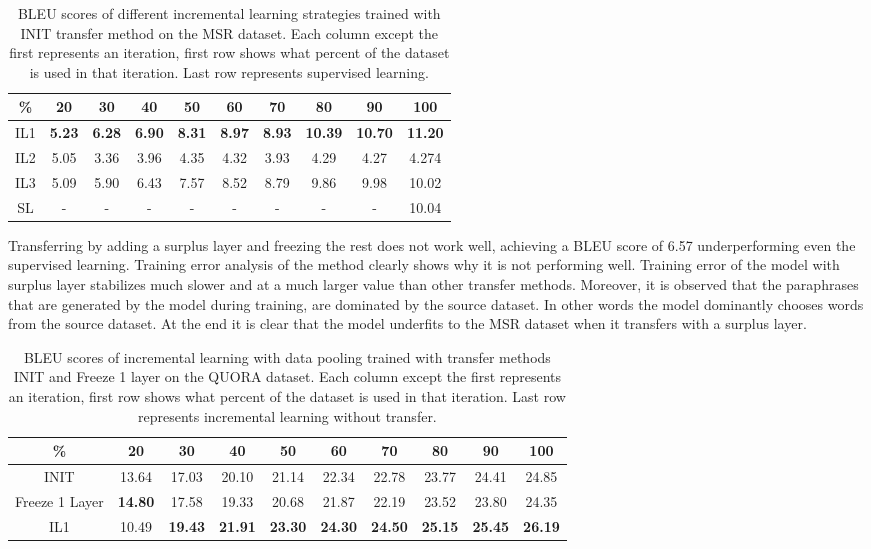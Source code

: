 \begin{table}[t]
\centering
\small
 \begin{tabular}{|c | c | c | c | c | c | c | c | c | c |} 
 \hline
 \% & 20 & 30 & 40 & 50 & 60 & 70 & 80 & 90 & 100 \\ [0.5ex] 
 \hline
  IL1 & \textbf{5.23} & \textbf{6.28} & \textbf{6.90} & \textbf{8.31} & \textbf{8.97} & \textbf{8.93} & \textbf{10.39} & \textbf{10.70} & \textbf{11.20}  \\ 
 \hline
  IL2 & 5.05 & 3.36 & 3.96 & 4.35 & 4.32 & 3.93 & 4.29 & 4.27 & 4.274 \\ 
 \hline
  IL3 & 5.09 & 5.90 & 6.43 & 7.57 & 8.52 & 8.79 & 9.86 & 9.98 & 10.02 \\ 
  \hline
  SL & - & - & - & - & - & - & - & - & 10.04 \\ 
 \hline
\end{tabular}
\caption{BLEU scores of different incremental learning strategies trained with INIT transfer method on the MSR dataset. Each column except the first represents an iteration, first row shows what percent of the dataset is used in that iteration. Last row represents supervised learning.}
\end{table}

Transferring by adding a surplus layer and freezing the rest does not work well, achieving a BLEU score of 6.57 underperforming even the supervised learning. Training error analysis of the method clearly shows why it is not performing well. Training error of the model with surplus layer stabilizes much slower and at a much larger value than other transfer methods. Moreover, it is observed that the paraphrases that are generated by the model during training, are dominated by the source dataset. In other words the model dominantly chooses words from the source dataset. At the end it is clear that the model underfits to the MSR dataset when it transfers with a surplus layer.

\begin{table}[b]
\centering
\footnotesize
 \begin{tabular}{|c | c | c | c | c | c | c | c | c | c |} 
 \hline
 \% & 20 & 30 & 40 & 50 & 60 & 70 & 80 & 90 & 100 \\ [0.5ex] 
 \hline
  INIT & 13.64 & 17.03 & 20.10 & 21.14 & 22.34 & 22.78 & 23.77 & 24.41 & 24.85  \\ 
 \hline
  Freeze 1 Layer &  \textbf{14.80} & 17.58 & 19.33 & 20.68 & 21.87 & 22.19 & 23.52 & 23.80 & 24.35 \\ 
  \hline
  IL1 & 10.49 &  \textbf{19.43} & \textbf{21.91} &  \textbf{23.30} &  \textbf{24.30} &  \textbf{24.50} &  \textbf{25.15} &  \textbf{25.45} &  \textbf{26.19}  \\ 
 \hline
\end{tabular}
\caption{BLEU scores of incremental learning with data pooling trained with transfer methods INIT and Freeze 1 layer on the QUORA dataset. Each column except the first represents an iteration, first row shows what percent of the dataset is used in that iteration. Last row represents incremental learning without transfer.}
\end{table}

